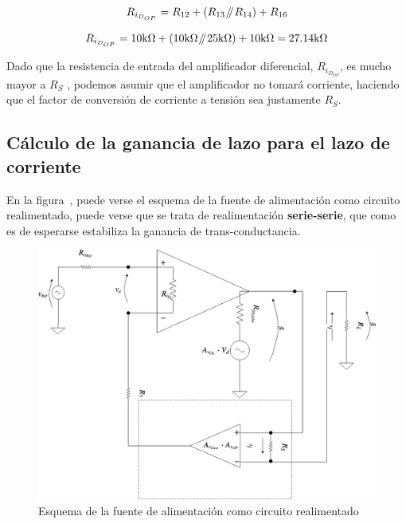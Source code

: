 \begin{equation}
R_{i_{D_{OP}}} = R_{12} + \left( R_{13} \parallelresistors R_{14} \right) + R_{16}
\end{equation}

\begin{equation*}
R_{i_{D_{OP}}} = 10 \si[per-mode=symbol]{\kilo\ohm} + \left( 10 \si[per-mode=symbol]{\kilo\ohm} \parallelresistors 25 \si[per-mode=symbol]{\kilo\ohm} \right) + 10 \si[per-mode=symbol]{\kilo\ohm} = 27.14 \si[per-mode=symbol]{\kilo\ohm}
\end{equation*}



Dado que la resistencia de entrada del amplificador diferencial, $R_{i_{D_{OP}}}$, es mucho mayor a $R_{S}$ , podemos asumir que el amplificador no tomará corriente, haciendo que el factor de conversión de corriente a tensión sea justamente $R_{S}$.


\clearpage

\subsection{Cálculo de la ganancia de lazo para el lazo de corriente}

\label{section:current_loop_justification}


En la figura~, puede verse el esquema de la fuente de alimentación como circuito realimentado, puede verse que se trata de realimentación \textbf{serie-serie}, que como es de esperarse estabiliza la ganancia de trans-conductancia.

\begin{figure}[H] %
\begin{center}
\includegraphics[width=0.9 \textwidth, angle=0]{./img/current_loop/CURRENT_LOOP_1.png}
\caption{\label{fig:fig_current_loop_1}\footnotesize{Esquema de la fuente de alimentación como circuito realimentado}}
\end{center}
\end{figure}

